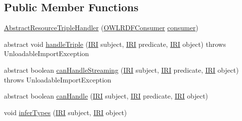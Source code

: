 \subsection*{Public Member Functions}
\begin{DoxyCompactItemize}
\item 
\hyperlink{classorg_1_1coode_1_1owlapi_1_1rdfxml_1_1parser_1_1_abstract_resource_triple_handler_a0c0089fb5257aea0667573d6078bfcbf}{Abstract\-Resource\-Triple\-Handler} (\hyperlink{classorg_1_1coode_1_1owlapi_1_1rdfxml_1_1parser_1_1_o_w_l_r_d_f_consumer}{O\-W\-L\-R\-D\-F\-Consumer} \hyperlink{classorg_1_1coode_1_1owlapi_1_1rdfxml_1_1parser_1_1_abstract_triple_handler_a4ccf4d898ff01eb1cadfa04b23d54e9c}{consumer})
\item 
abstract void \hyperlink{classorg_1_1coode_1_1owlapi_1_1rdfxml_1_1parser_1_1_abstract_resource_triple_handler_acfa19ca318d5aaf7fc66e361ba02e7e8}{handle\-Triple} (\hyperlink{classorg_1_1semanticweb_1_1owlapi_1_1model_1_1_i_r_i}{I\-R\-I} subject, \hyperlink{classorg_1_1semanticweb_1_1owlapi_1_1model_1_1_i_r_i}{I\-R\-I} predicate, \hyperlink{classorg_1_1semanticweb_1_1owlapi_1_1model_1_1_i_r_i}{I\-R\-I} object)  throws Unloadable\-Import\-Exception
\item 
abstract boolean \hyperlink{classorg_1_1coode_1_1owlapi_1_1rdfxml_1_1parser_1_1_abstract_resource_triple_handler_a2b7e4ec766d2e5c588e3685ae94797f9}{can\-Handle\-Streaming} (\hyperlink{classorg_1_1semanticweb_1_1owlapi_1_1model_1_1_i_r_i}{I\-R\-I} subject, \hyperlink{classorg_1_1semanticweb_1_1owlapi_1_1model_1_1_i_r_i}{I\-R\-I} predicate, \hyperlink{classorg_1_1semanticweb_1_1owlapi_1_1model_1_1_i_r_i}{I\-R\-I} object)  throws Unloadable\-Import\-Exception
\item 
abstract boolean \hyperlink{classorg_1_1coode_1_1owlapi_1_1rdfxml_1_1parser_1_1_abstract_resource_triple_handler_a6777b590332c9b44ef9a5374737994ac}{can\-Handle} (\hyperlink{classorg_1_1semanticweb_1_1owlapi_1_1model_1_1_i_r_i}{I\-R\-I} subject, \hyperlink{classorg_1_1semanticweb_1_1owlapi_1_1model_1_1_i_r_i}{I\-R\-I} predicate, \hyperlink{classorg_1_1semanticweb_1_1owlapi_1_1model_1_1_i_r_i}{I\-R\-I} object)
\item 
void \hyperlink{classorg_1_1coode_1_1owlapi_1_1rdfxml_1_1parser_1_1_abstract_resource_triple_handler_a3a54717ce12b1944d01db7616cf55c1a}{infer\-Types} (\hyperlink{classorg_1_1semanticweb_1_1owlapi_1_1model_1_1_i_r_i}{I\-R\-I} subject, \hyperlink{classorg_1_1semanticweb_1_1owlapi_1_1model_1_1_i_r_i}{I\-R\-I} object)
\end{DoxyCompactItemize}
